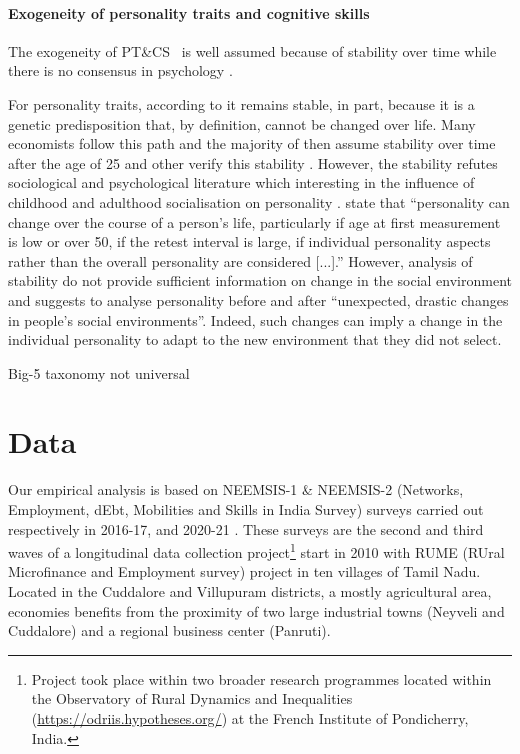 \documentclass[a4paper, 12pt, onecolumn]{article}
\newcommand{\PTCS}{PT\&CS}
\begin{document}
\paragraph{Exogeneity of personality traits and cognitive skills}
The exogeneity of \PTCS~ is well assumed because of stability over time while there is no consensus in psychology \citep{Ardelt2000, Deary2014}.

For personality traits, according to \cite{Costa1997, McCrae2000} it remains stable, in part, because it is a genetic predisposition that, by definition, cannot be changed over life.
Many economists follow this path and the majority of then assume stability over time after the age of 25 \citep{CobbClark2012} and other verify this stability \citep{CobbClark2011}.
However, the stability refutes sociological and psychological literature which interesting in the influence of childhood and adulthood socialisation on personality \citep{Mortimer1978, Moen1995}.
\cite{Ardelt2000} state that ``personality can change over the course of a person's life, particularly if age at first measurement is low or over 50, if the retest interval is large, if individual personality aspects rather than the overall personality are considered [...].''
However, analysis of stability do not provide sufficient information on change in the social environment and \cite{Ardelt2000} suggests to analyse personality before and after ``unexpected, drastic changes in people's social environments''.
Indeed, such changes can imply a change in the individual personality to adapt to the new environment that they did not select.

Big-5 taxonomy not universal \cite{Gurven2013}


\clearpage
\newpage
\section{Data}
\label{section:data}

Our empirical analysis is based on NEEMSIS-1 \& NEEMSIS-2 (Networks, Employment, dEbt, Mobilities and Skills in India Survey) surveys carried out respectively in 2016-17, and 2020-21 \citep{NEEMSISreport, NEEMSIS2017}.
These surveys are the second and third waves of a longitudinal data collection project\footnote{Project took place within two broader research programmes located within the Observatory of Rural Dynamics and Inequalities (\url{https://odriis.hypotheses.org/}) at the French Institute of Pondicherry, India.} start in 2010 with RUME (RUral Microfinance and Employment survey) project in ten villages of Tamil Nadu.
Located in the Cuddalore and Villupuram districts, a mostly agricultural area, economies benefits from the proximity of two large industrial towns (Neyveli and Cuddalore) and a regional business center (Panruti).
\end{document}
